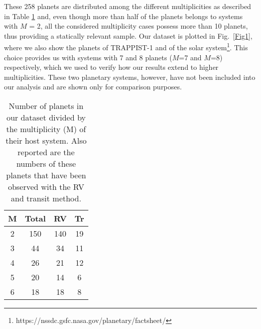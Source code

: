 \documentclass[letter]{aa} %
\begin{document}
These 258 planets are distributed among the different multiplicities as described in Table \ref{table:1} and, even though more than half of the planets belongs to systems with $M$ = 2, all the considered multiplicity cases possess more than 10 planets, thus providing a statically relevant sample. Our dataset is plotted in Fig.~\ref{Fig1}, where we also show the planets of TRAPPIST-1 \citep{trappist} and of the solar system\footnote{https://nssdc.gsfc.nasa.gov/planetary/factsheet/}. This choice provides us with systems with 7 and 8 planets ($M$=7 and $M$=8) respectively, which we used to verify how our results extend to higher multiplicities. These two planetary systems, however, have not been included into our analysis and are shown only for comparison purposes.\\
        
        \begin{table}
                \caption{Number of planets in our dataset divided by the multiplicity (M) of their host system. Also reported are the numbers of these planets that have been observed with the RV and transit method.}%
                \label{table:1}      %
                \centering                          %
                \begin{tabular}{c c c c}        %
                        \hline\hline                 %
                        M & Total & RV & Tr \\    %
                        \hline                        %
                        2 & 150 & 140 & 19 \\      %
                        3 & 44 & 34  & 11 \\
                        4 & 26 & 21   & 12 \\
                        5 & 20 & 14  & 6 \\
                        6 & 18 & 18   & 8 \\ 
                        \hline                                   %
                \end{tabular}
        \end{table}
        
\end{document}
